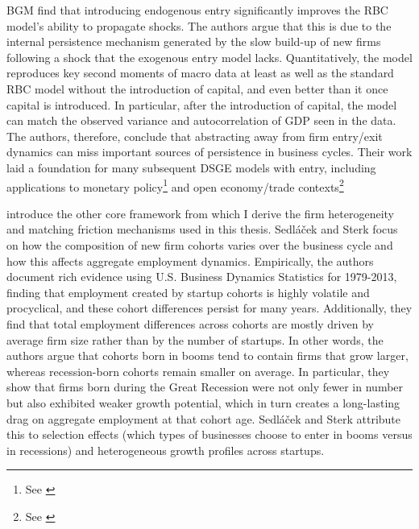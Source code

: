 \documentclass[a4paper,12pt]{article} %
\numberwithin{equation}{section} %
\numberwithin{figure}{section}
\numberwithin{table}{section}
\begin{document}
BGM find that introducing endogenous entry significantly improves the RBC model's ability to propagate shocks. The authors argue that this is due to the internal persistence mechanism generated by the slow build-up of new firms following a shock that the exogenous entry model lacks. Quantitatively, the model reproduces key second moments of macro data at least as well as the standard RBC model without the introduction of capital, and even better than it once capital is introduced. In particular, after the introduction of capital, the model can match the observed variance and autocorrelation of GDP seen in the data. The authors, therefore, conclude that abstracting away from firm entry/exit dynamics can miss important sources of persistence in business cycles. Their work laid a foundation for many subsequent DSGE models with entry, including applications to monetary policy\footnote{See \textcite{bilbiie2007monetary,bergin2008extensive,etro2015new}} and open economy/trade contexts\footnote{See \textcite{epifani2011trade,bergin2015international}}

\textcite{sedlavcek2017growth} introduce the other core framework from which I derive the firm heterogeneity and matching friction mechanisms used in this thesis. Sedláček and Sterk focus on how the composition of new firm cohorts varies over the business cycle and how this affects aggregate employment dynamics. Empirically, the authors document rich evidence using U.S. Business Dynamics Statistics for 1979-2013, finding that employment created by startup cohorts is highly volatile and procyclical, and these cohort differences persist for many years. Additionally, they find that total employment differences across cohorts are mostly driven by average firm size rather than by the number of startups. In other words, the authors argue that cohorts born in booms tend to contain firms that grow larger, whereas recession-born cohorts remain smaller on average. In particular, they show that firms born during the Great Recession were not only fewer in number but also exhibited weaker growth potential, which in turn creates a long-lasting drag on aggregate employment at that cohort age. Sedláček and Sterk attribute this to selection effects (which types of businesses choose to enter in booms versus in recessions) and heterogeneous growth profiles across startups.
\end{document}

